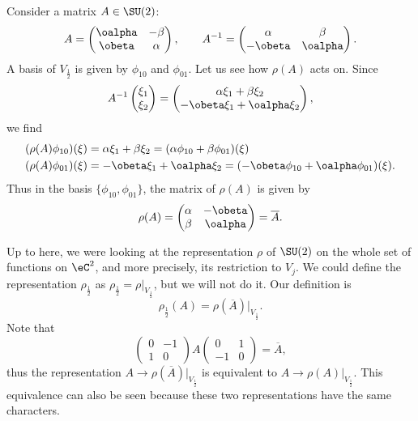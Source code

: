 Consider a matrix $A\in\SU(2)$:
\begin{equation}
A=\begin{pmatrix}
\oalpha & -\beta \\
\obeta & \alpha
\end{pmatrix},\qquad
A^{-1}=\begin{pmatrix}
\alpha & \beta \\
-\obeta & \oalpha
\end{pmatrix}.
\end{equation}
A basis of $V_{\frac{1}{2}}$ is given by $\phi_{10}$ and $\phi_{01}$. Let us see how $\rho(A)$ acts on. Since
\[
A^{-1}\begin{pmatrix}
\xi_1 \\
\xi_2
\end{pmatrix}=
\begin{pmatrix}
\alpha\xi_1+\beta\xi_2 \\
-\obeta\xi_1+\oalpha\xi_2
\end{pmatrix},
\]
we find
\begin{equation}
\begin{split}
  (\rho(A)\phi_{10})(\xi)&=\alpha\xi_1+\beta\xi_2=(\alpha\phi_{10}+\beta\phi_{01})(\xi)\\
  (\rho(A)\phi_{01})(\xi)&=-\obeta\xi_1+\oalpha\xi_2=(-\obeta\phi_{10}+\oalpha\phi_{01})(\xi).
\end{split}
\end{equation}
Thus in the basis $\{\phi_{10},\phi_{01}\}$, the matrix of $\rho(A)$ is given by
\begin{equation}
\rho(A)=\begin{pmatrix}
\alpha & -\obeta \\
\beta & \oalpha
\end{pmatrix}=\overline{A}.
\end{equation}

Up to here, we were looking at the representation $\rho$ of $\SU(2)$ on the whole set of functions on $\eC^2$, and more precisely, its restriction to $V_j$. We could define the representation $\rho_{\frac{1}{2}}$ as $\rho_{\frac{1}{2}}=\rho|_{V_{\frac{1}{2}}}$, but we will not do it. Our definition is
\begin{equation}
  \rho_{\frac{1}{2}}(A)=\rho(\overline{A})|_{V_{\frac{1}{2}}}.
\end{equation}
Note that
\[
\begin{pmatrix}
0 & -1 \\
1 & 0
\end{pmatrix}
A
\begin{pmatrix}
0 & 1 \\
-1 & 0
\end{pmatrix}=\overline{A},
\]
thus the representation $A\to\rho(\overline{A})|_{V_{\frac{1}{2}}}$ is equivalent to $A\to\rho(A)|_{V_{\frac{1}{2}}}$. This equivalence can also be seen because these two representations have the same characters\quextproj.

